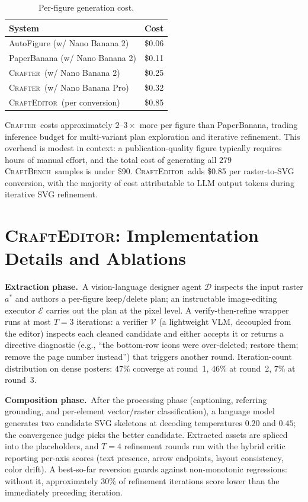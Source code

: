 \documentclass{article}
\newcommand{\Crafter}{\textsc{Crafter}\xspace}
\newcommand{\Editor}{\textsc{CraftEditor}\xspace}
\newcommand{\CrafterBench}{\textsc{CraftBench}\xspace}
\begin{document}
\begin{table}[h]
\centering
\small
\caption{Per-figure generation cost.}
\label{tab:cost}
\begin{tabular}{@{}lr@{}}
\toprule
\textbf{System} & \textbf{Cost} \\
\midrule
AutoFigure (w/ Nano Banana 2) & \$0.06 \\
PaperBanana (w/ Nano Banana 2) & \$0.11 \\
\Crafter\ (w/ Nano Banana 2) & \$0.25 \\
\Crafter\ (w/ Nano Banana Pro) & \$0.32 \\
\midrule
\Editor\ (per conversion) & \$0.85 \\
\bottomrule
\end{tabular}
\end{table}

\Crafter\ costs approximately $2$--$3\times$ more per figure than 
PaperBanana, trading inference budget for multi-variant plan 
exploration and iterative refinement. This overhead is modest in 
context: a publication-quality figure typically requires hours of 
manual effort, and the total cost of generating all $279$
\CrafterBench\ samples is under \$90. \Editor\ adds \$0.85 per 
raster-to-SVG conversion, with the majority of cost attributable to 
LLM output tokens during iterative SVG refinement.

\section{\Editor: Implementation Details and Ablations}
\label{app:editable-ablations}

\noindent\textbf{Extraction phase.}\ 
A vision-language designer agent $\mathcal{D}$ inspects the input
raster $a^*$ and authors a per-figure keep/delete plan; an
instructable image-editing executor $\mathcal{E}$ carries out the
plan at the pixel level.
A verify-then-refine wrapper runs at most $T{=}3$ iterations: a
verifier $\mathcal{V}$ (a lightweight VLM, decoupled from the
editor) inspects each cleaned candidate and either accepts it or
returns a directive diagnostic (e.g., ``the bottom-row icons were
over-deleted; restore them; remove the page number instead'') that
triggers another round.
Iteration-count distribution on dense posters: $47\%$ converge at
round~1, $46\%$ at round~2, $7\%$ at round~3.

\noindent\textbf{Composition phase.}\ 
After the processing phase (captioning, referring grounding, and
per-element vector/raster classification), a language model
generates two candidate SVG skeletons at decoding temperatures
$0.20$ and $0.45$; the convergence judge picks the better
candidate.
Extracted assets are spliced into the placeholders, and $T{=}4$
refinement rounds run with the hybrid critic reporting per-axis
scores (text presence, arrow endpoints, layout consistency, color
drift).
A best-so-far reversion guards against non-monotonic regressions:
without it, approximately $30\%$ of refinement iterations score
lower than the immediately preceding iteration.
\end{document}

